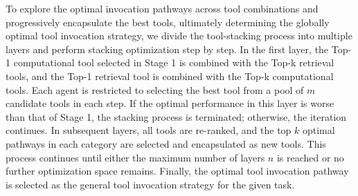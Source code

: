 

To explore the optimal invocation pathways across tool combinations and progressively encapsulate the best tools, ultimately determining the globally optimal tool invocation strategy, we divide the tool-stacking process into multiple layers and perform stacking optimization step by step.
In the first layer, the Top-1 computational tool selected in Stage 1 is combined with the Top-k retrieval tools, and the Top-1 retrieval tool is combined with the Top-k computational tools. Each agent is restricted to selecting the best tool from a pool of $m$ candidate tools in each step. If the optimal performance in this layer is worse than that of Stage 1, the stacking process is terminated; otherwise, the iteration continues.
In subsequent layers, all tools are re-ranked, and the top $k$ optimal pathways in each category are selected and encapsulated as new tools. This process continues until either the maximum number of layers $n$ is reached or no further optimization space remains.
Finally, the optimal tool invocation pathway is selected as the general tool invocation strategy for the given task.



